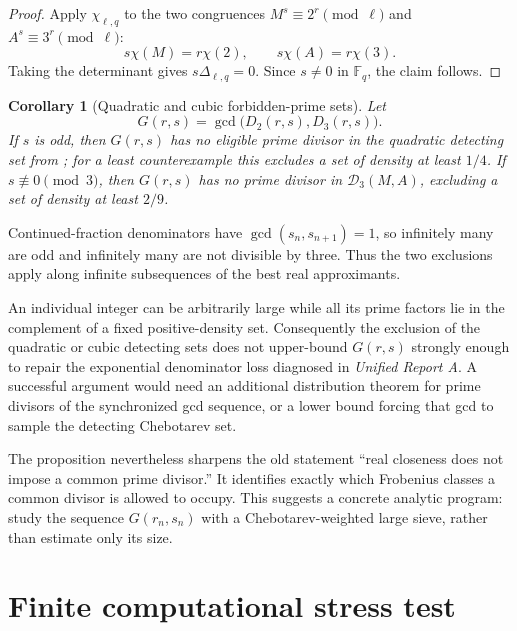 \documentclass[11pt]{article}
\numberwithin{equation}{section}
\newtheorem{corollary}[theorem]{Corollary}
\theoremstyle{definition}
\theoremstyle{remark}
\newcommand{\F}{\mathbb F}
\newcommand{\ReportA}{\textit{Unified Report A}}
\begin{document}
\begin{proof}
Apply \(\chi_{\ell,q}\) to the two congruences
\(M^s\equiv2^r\pmod\ell\) and \(A^s\equiv3^r\pmod\ell\):
\[
 s\chi(M)=r\chi(2),
 \qquad
 s\chi(A)=r\chi(3).
\]
Taking the determinant gives \(s\Delta_{\ell,q}=0\).  Since \(s\ne0\) in \(\F_q\), the
claim follows.
\end{proof}

\begin{corollary}[Quadratic and cubic forbidden-prime sets]
\label{cor:forbidden}
Let
\[
 G(r,s)=\gcd\bigl(D_2(r,s),D_3(r,s)\bigr).
\]
If \(s\) is odd, then \(G(r,s)\) has no eligible prime divisor in the quadratic detecting
set from ; for a least counterexample this excludes a set
of density at least \(1/4\).  If \(s\not\equiv0\pmod3\), then \(G(r,s)\) has no
prime divisor in \(\mathscr D_3(M,A)\), excluding a set of density at least \(2/9\).
\end{corollary}

Continued-fraction denominators have \(\gcd(s_n,s_{n+1})=1\), so infinitely many are odd
and infinitely many are not divisible by three.  Thus the two exclusions apply along infinite
subsequences of the best real approximants.

\begin{cautionbox}
An individual integer can be arbitrarily large while all its prime factors lie in the
complement of a fixed positive-density set.  Consequently the exclusion of
the quadratic or cubic detecting sets does not upper-bound \(G(r,s)\) strongly enough to repair the
exponential denominator loss diagnosed in \ReportA.  A successful argument would need an
additional distribution theorem for prime divisors of the synchronized gcd sequence, or a
lower bound forcing that gcd to sample the detecting Chebotarev set.
\end{cautionbox}

The proposition nevertheless sharpens the old statement ``real closeness does not impose a
common prime divisor.''  It identifies exactly which Frobenius classes a common divisor is
allowed to occupy.  This suggests a concrete analytic program: study the sequence
\(G(r_n,s_n)\) with a Chebotarev-weighted large sieve, rather than estimate only its size.

\section{Finite computational stress test}
\label{sec:computation}
\end{document}
